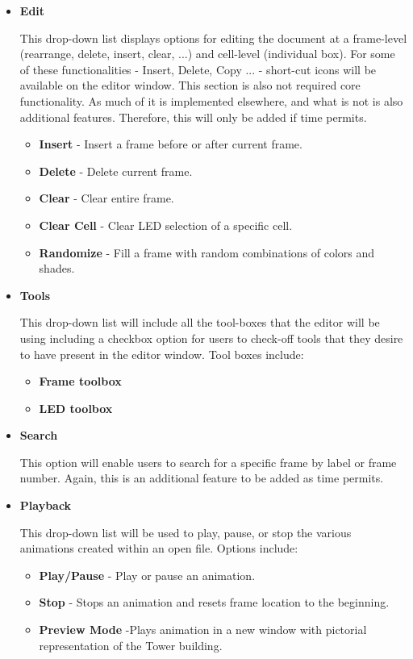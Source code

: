 \documentclass[]{article}
\begin{document}
\begin{itemize}

\item \textbf{Edit}

{This drop-down list displays options for editing the document at a frame-level (rearrange, delete, insert, clear, ...) and cell-level (individual box). For some of these functionalities - Insert, Delete, Copy ... - short-cut icons will be available on the editor window.  This section is also not required core functionality.  As much of it is implemented elsewhere, and what is not is also additional features.  Therefore, this will only be added if time permits.}

	\begin{itemize}
	\item \textbf{Insert} - Insert a frame before or after current frame.
	\item \textbf{Delete} - Delete current frame.
	\item \textbf{Clear} - Clear entire frame.
	\item \textbf{Clear Cell} - Clear LED selection of a specific cell.
	\item \textbf{Randomize} - Fill a frame with random combinations of colors and shades.
	\end{itemize}

\item \textbf{Tools}

{This drop-down list will include all the tool-boxes that the editor will be using including a checkbox option for users to check-off tools that they desire to have present in the editor window. Tool boxes include:}

	\begin{itemize}
	\item \textbf{Frame toolbox}
	\item \textbf{LED toolbox}

	\end{itemize}

\item \textbf{Search}

{This option will enable users to search for a specific frame by label or frame number.  Again, this is an additional feature to be added as time permits.}

\item \textbf{Playback}

{This drop-down list will be used to play, pause, or stop the various animations created within an open file. Options include: }
	\begin{itemize}
	\item \textbf{Play/Pause} - Play or pause an animation.
	\item \textbf{Stop} - Stops an animation and resets frame location to the beginning.
	\item \textbf{Preview Mode} -Plays animation in a new window with pictorial representation of the Tower building.


\end{itemize}
\end{itemize}
\end{document}
